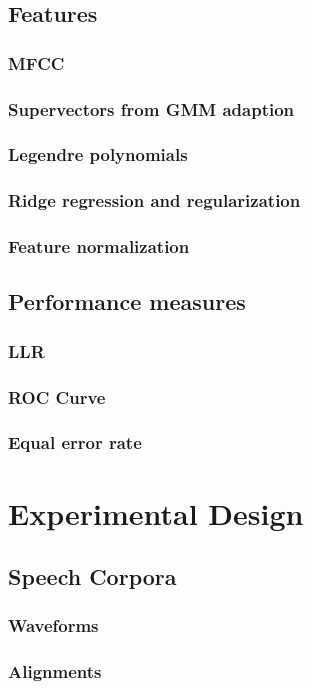 \documentclass[11pt,a4paper]{tesis}
\begin{document}
	\section{Features}
		\subsection{MFCC}
		\subsection{Supervectors from GMM adaption}
		\subsection{Legendre polynomials}
			\subsection{Ridge regression and regularization}
		\subsection{Feature normalization}
	\section{Performance measures}
		\subsection{LLR}
		\subsection{ROC Curve}
		\subsection{Equal error rate}
\chapter{Experimental Design}
	\section{Speech Corpora}
		\subsection{Waveforms}
		\subsection{Alignments}
\end{document}

